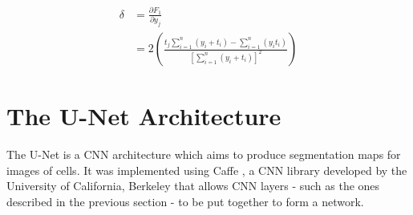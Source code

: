 \begin {align}
	\delta &= \frac{\partial F_1}{\partial y_j}\\
	&= 2 \left ( \frac{t_j \sum_{i=1}^{n} \left ( y_i + t_i \right ) - \sum_{i=1}^{n} \left ( y_i t_i \right )  }{\left [ \sum_{i=1}^{n} \left ( y_i + t_i \right ) \right ]^2 } \right )
\end {align}


	\section {The U-Net Architecture}
The U-Net \cite{unet} is a CNN architecture which aims to produce segmentation maps for images of cells. It was implemented using Caffe \cite{caffe}, a CNN library developed by the University of California, Berkeley that allows CNN layers - such as the ones described in the previous section - to be put together to form a network.

